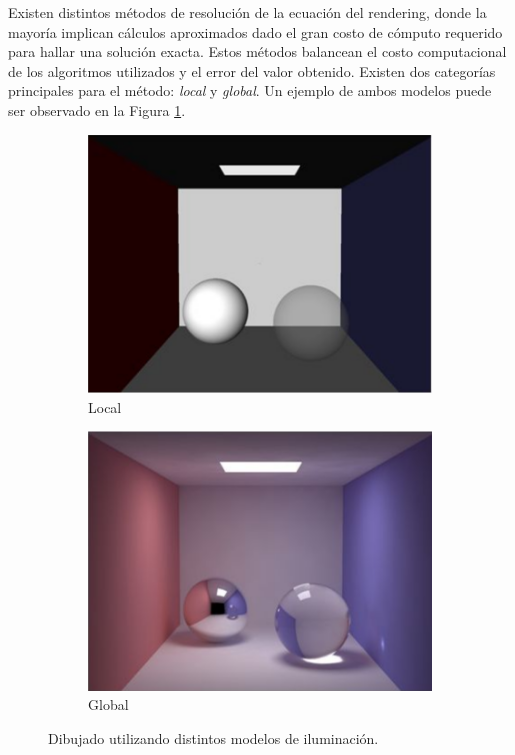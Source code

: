 Existen distintos métodos de resolución de la ecuación del rendering, donde la mayoría implican cálculos aproximados dado el gran costo de cómputo requerido para hallar una solución exacta. Estos métodos balancean el costo computacional de los algoritmos utilizados y el error del valor obtenido. Existen dos categorías principales para el método: \textit{local} y \textit{global}. Un ejemplo de ambos modelos puede ser observado en la Figura \ref{local-vs-global-img}.

\vspace{5mm}
\begin{figure}[htbp!]
	\begin{subfigure}{0.5\textwidth}
		  	\centering
   		 	\includegraphics[width=1\linewidth]{assets/local}
   		 	\caption{Local}
   	\end{subfigure}
    \begin{subfigure}{0.5\textwidth}
    	\centering
    	\includegraphics[width=1\linewidth]{assets/global}
    	\caption{Global}
    \end{subfigure}
    \caption{Dibujado utilizando distintos modelos de iluminación.}
    \label{local-vs-global-img}
\end{figure}

